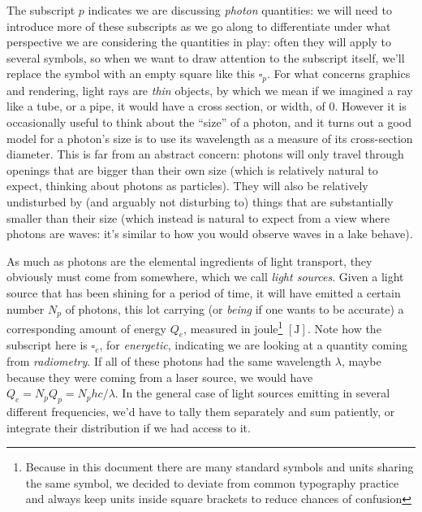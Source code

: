 The subscript $p$ indicates we are discussing \textsl{photon} quantities: 
we will need to introduce more of these subscripts as we go along to differentiate under 
what perspective we are considering the quantities in play: often they will apply to
several symbols, so when we want to draw attention to the subscript itself, we'll replace
the symbol with an empty square like this $\square_p$.
For what concerns graphics and rendering, light rays are \textsl{thin} objects, by which we mean 
if we imagined a ray like a tube, or a pipe, it would have a cross section, or width, of $0$. 
However it is occasionally useful to think about the ``size'' of a photon, and it turns out a 
good model for a photon's size is to use its wavelength as a measure of its cross-section diameter.
This is far from an abstract concern: photons will only travel through openings that are bigger 
than their own size (which is relatively natural to expect, thinking about photons as particles).
They will also be relatively undisturbed by (and arguably not disturbing to) things that are 
substantially smaller than their size (which instead is natural to expect from a view where 
photons are waves: it's similar to how you would observe waves in a lake behave).

As much as photons are the elemental ingredients of light transport, 
they obviously must come from somewhere, which we call \textsl{light sources}.
Given a light source that has been shining for a period of time, it will have emitted a
certain number $N_p$ of photons, this lot carrying (or \emph{being} if one wants to be accurate) 
a corresponding amount of energy $Q_e$, measured in joule\footnote{Because in this document there 
	are many standard symbols and units sharing the same symbol, we decided to deviate from
	common typography practice and always keep units inside square brackets to reduce 
	chances of confusion} $[\unit{\joule}]$. 
Note how the subscript here is $\square_e$, for \textsl{energetic}, indicating
we are looking at a quantity coming from \textsl{\gls{radiometry}}. 
If all of these photons had the same wavelength $\lambda$, maybe because they were coming 
from a laser source, we would have $Q_e = N_p Q_p = N_p  hc/\lambda$. In the general case
of light sources emitting in several different frequencies, we'd have to tally them separately
and sum patiently, or integrate their distribution if we had access to it.

